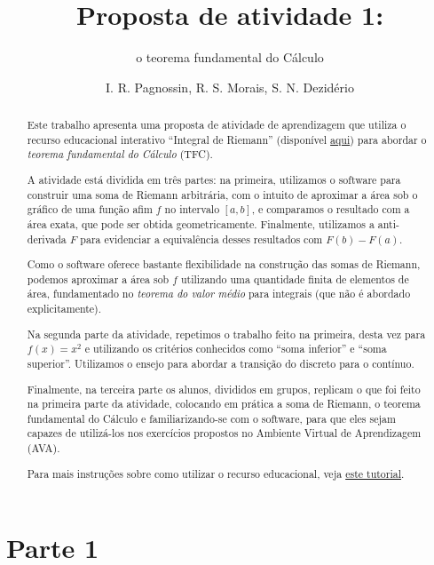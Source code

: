 \documentclass[a4paper,12pt]{scrartcl}
\title{Proposta de atividade 1:}
\subtitle{o teorema fundamental do Cálculo}
\author{I. R. Pagnossin, R. S. Morais, S. N. Dezidério}
\begin{document}
  \setlength\parindent{2em}

  \maketitle

  \begin{abstract}
    Este trabalho apresenta uma proposta de atividade de aprendizagem que utiliza o recurso educacional interativo ``Integral de Riemann''
    (disponível \href{http://cepa-usp.github.io/AI-0170/}{aqui}) para abordar o \emph{teorema fundamental do Cálculo} (TFC).
    
    A atividade está dividida em três partes: na primeira, utilizamos o software para construir uma soma de Riemann arbitrária,
    com o intuito de aproximar a área sob o gráfico de uma função afim $f$ no intervalo $[a,b]$, e comparamos o resultado com a área exata,
    que pode ser obtida geometricamente. Finalmente, utilizamos a anti-derivada $F$ para evidenciar a equivalência desses resultados com $F(b) - F(a)$.
    
    Como o software oferece bastante flexibilidade na construção das somas de Riemann, podemos aproximar a área sob $f$ utilizando uma quantidade
    finita de elementos de área, fundamentado no \emph{teorema do valor médio} para integrais (que não é abordado explicitamente).
    
    Na segunda parte da atividade, repetimos o trabalho feito na primeira, desta vez para $f(x) = x^2$ e utilizando os critérios
    conhecidos como ``soma inferior'' e ``soma superior''. Utilizamos o ensejo para abordar a transição do discreto para o contínuo.
    
    Finalmente, na terceira parte os alunos, divididos em grupos, replicam o que foi feito na primeira parte da atividade,
    colocando em prática a soma de Riemann, o teorema fundamental do Cálculo e familiarizando-se com o software, para que
    eles sejam capazes de utilizá-los nos exercícios propostos no Ambiente Virtual de Aprendizagem (AVA).
    
    
    
    Para mais instruções sobre como utilizar o recurso educacional, veja \href{http://www.youtube.com/watch?v=PJlPleMYuG4&t=22}{este tutorial}.
  \end{abstract}
  
  \section*{Parte 1}
  
\end{document}
